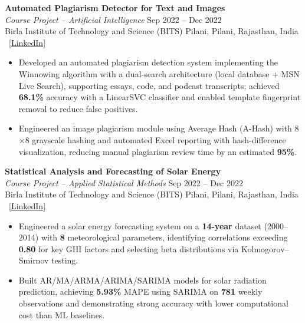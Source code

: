 \documentclass[11pt,letterpaper]{article}
\begin{document}
\vspace{6pt}
\textbf{Automated Plagiarism Detector for Text and Images}\\
\textit{Course Project -- Artificial Intelligence} \hfill Sep 2022 -- Dec 2022\\
Birla Institute of Technology and Science (BITS) Pilani, Pilani, Rajasthan, India \textbar\ \href{https://www.linkedin.com/in/namit-shrivastava-baab47204/details/projects/}{[LinkedIn]}
\begin{itemize}[leftmargin=16pt, noitemsep, topsep=2pt]
    \item Developed an automated plagiarism detection system implementing the Winnowing algorithm with a dual-search architecture (local database + MSN Live Search), supporting essays, code, and podcast transcripts; achieved \textbf{68.1\%} accuracy with a LinearSVC classifier and enabled template fingerprint removal to reduce false positives.
    \item Engineered an image plagiarism module using Average Hash (A-Hash) with 8$\times$8 grayscale hashing and automated Excel reporting with hash-difference visualization, reducing manual plagiarism review time by an estimated \textbf{95\%}.
\end{itemize}

\vspace{6pt}
\textbf{Statistical Analysis and Forecasting of Solar Energy}\\
\textit{Course Project -- Applied Statistical Methods} \hfill Sep 2022 -- Dec 2022\\
Birla Institute of Technology and Science (BITS) Pilani, Pilani, Rajasthan, India \textbar\ \href{https://www.linkedin.com/in/namit-shrivastava-baab47204/details/projects/}{[LinkedIn]}
\begin{itemize}[leftmargin=16pt, noitemsep, topsep=2pt]
    \item Engineered a solar energy forecasting system on a \textbf{14-year} dataset (2000--2014) with \textbf{8} meteorological parameters, identifying correlations exceeding \textbf{0.80} for key GHI factors and selecting beta distributions via Kolmogorov--Smirnov testing.
    \item Built AR/MA/ARMA/ARIMA/SARIMA models for solar radiation prediction, achieving \textbf{5.93\%} MAPE using SARIMA on \textbf{781} weekly observations and demonstrating strong accuracy with lower computational cost than ML baselines.
\end{itemize}
\end{document}
